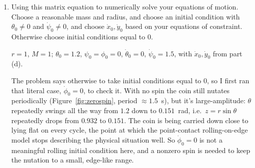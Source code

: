 \documentclass[11pt]{article}
\begin{document}
\begin{enumerate}[label=(\alph*)]
$${\begin{bmatrix}
    0 & 0 & \tfrac12Mr^2c_\theta & 0 & \tfrac12Mr^2 & -rc_\psi & -rs_\psi\\
    1 & 0 & rc_\psi c_\theta & -rs_\psi s_\theta & rc_\psi & 0 & 0\\
    0 & 1 & rs_\psi c_\theta & rs_\theta c_\psi & rs_\psi & 0 & 0
    \end{bmatrix}$}$$
    $$\resizebox{0.7\textwidth}{!}{$b_7=\begin{bmatrix}
    0\\[2pt] 0\\[2pt]
    \tfrac12Mr^2s_\theta\dot\theta\left(\dot\phi+\dot\psi c_\theta\right)\\[4pt]
    -Mr^2 s_\theta c_\theta\!\left(\tfrac14\dot\psi^2-\dot\theta^2\right)-\tfrac12Mr^2s_\theta\dot\phi\dot\psi-Mgr c_\theta\\[4pt]
    \tfrac12Mr^2\dot\psi\dot\theta s_\theta\\[4pt]
    rs_\psi c_\theta\!\left(\dot\psi^2+\dot\theta^2\right)+rs_\psi\dot\phi\dot\psi+2rs_\theta c_\psi\dot\psi\dot\theta\\[4pt]
    2rs_\psi s_\theta\dot\psi\dot\theta-rc_\psi c_\theta\!\left(\dot\psi^2+\dot\theta^2\right)-rc_\psi\dot\phi\dot\psi
    \end{bmatrix}$}$$
    with rows/columns ordered $(\ddot x,\ddot y,\ddot\psi,\ddot\theta,\ddot\phi,\lambda_1,\lambda_2)$; rows 1--2 are the $x,y$ equations, rows 3--5 are the $\psi,\theta,\phi$ equations above, and rows 6--7 are the differentiated constraints $\dot\phi_1=0$, $\dot\phi_2=0$.

    \item Using this matrix equation to numerically solve your equations of motion. Choose a reasonable mass and radius, and choose an initial condition with $\theta_0\neq0$ and $\dot\psi_0\neq0$, and choose $\dot x_0,\dot y_0$ based on your equations of constraint. Otherwise choose initial conditions equal to $0$.

    $r=1$, $M=1$; $\theta_0=1.2$, $\psi_0=\phi_0=0$, $\dot\theta_0=0$, $\dot\psi_0=1.5$, with $\dot x_0,\dot y_0$ from part (d).

    The problem says otherwise to take initial conditions equal to $0$, so I first ran that literal case, $\dot\phi_0=0$, to check it. With no spin the coin still nutates periodically (Figure~\ref{fig:zerospin}, period $\approx1.5$~s), but it's large-amplitude: $\theta$ repeatedly swings all the way from $1.2$ down to $0.151$~rad, i.e.\ $z=r\sin\theta$ repeatedly drops from $0.932$ to $0.151$. The coin is being carried down close to lying flat on every cycle, the point at which the point-contact rolling-on-edge model stops describing the physical situation well. So $\dot\phi_0=0$ is not a meaningful rolling initial condition here, and a nonzero spin is needed to keep the nutation to a small, edge-like range.


\end{enumerate}
\end{document}
